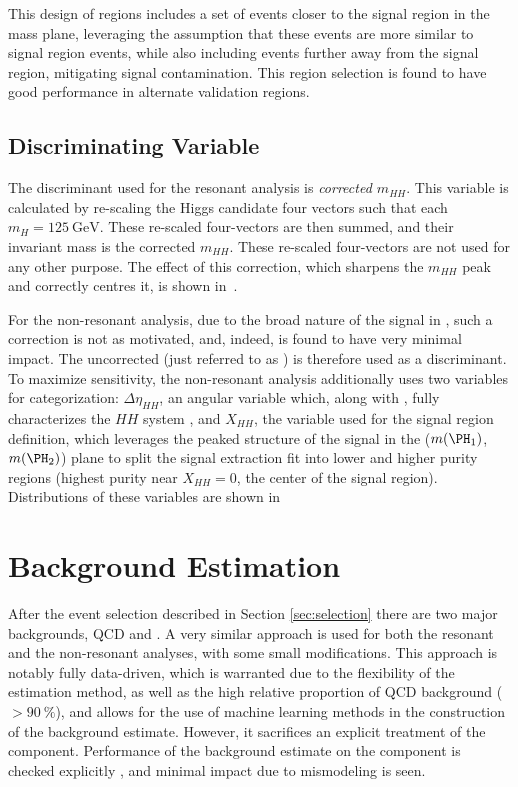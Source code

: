 This design of regions includes a set of events closer to the signal region in the mass plane, leveraging
the assumption that these events are more similar to signal region events, while also including events further away
from the signal region, mitigating signal contamination. This region selection is found to have good performance
in alternate validation regions. 

\subsection{Discriminating Variable}
\label{subsec:disc-var}

The discriminant used for the resonant analysis is \emph{corrected $m_{HH}$}. This
variable is calculated by re-scaling the Higgs candidate four vectors such that
each $m_{H} = \SI{125}{\GeV}$. These re-scaled four-vectors are then summed, and
their invariant mass is the corrected $m_{HH}$. These re-scaled four-vectors are
not used for any other purpose. The effect of this correction, which sharpens
the $m_{HH}$ peak and correctly centres it, is shown
in~\Fig{\ref{fig:m-hh-cor-effect}}.

For the non-resonant analysis, due to the broad nature of the signal in \mhh, such a 
correction is not as motivated, and, indeed, is found to have very minimal 
impact. The uncorrected \mhh (just referred to as \mhh) is therefore used 
as a discriminant. To maximize sensitivity, the non-resonant analysis 
additionally uses two variables for categorization: $\Delta \eta_{HH}$, an angular 
variable which, along with \mhh, fully characterizes the $HH$ system
, and $X_{HH}$, the variable used for the 
signal region definition, which leverages the peaked structure of the 
signal in the ($\mh1$, $\mh2$) plane to split the signal extraction fit into lower and higher
purity regions (highest purity near $X_{HH} = 0$, the center of the signal region).
Distributions of these variables are shown in 


\section{Background Estimation}
After the event selection described in Section \ref{sec:selection} there are
two major backgrounds, QCD and \ttbar. A very similar approach is used 
for both the resonant and the non-resonant analyses, with some small modifications. 
This approach is notably fully data-driven, which is warranted due to 
the flexibility of the estimation method, as well as the high relative proportion of 
QCD background ($>90~\%$), and allows for the use of machine learning methods in the construction of
the background estimate. However, it sacrifices an explicit treatment of the
\ttbar component. Performance of the background estimate on the \ttbar component
is checked explicitly , and minimal impact due to \ttbar 
mismodeling is seen.

